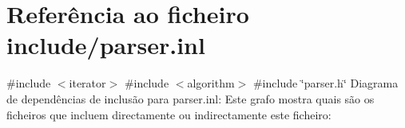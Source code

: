 \hypertarget{parser_8inl}{}\section{Referência ao ficheiro include/parser.inl}
\label{parser_8inl}
{\ttfamily \#include $<$iterator$>$}\newline
{\ttfamily \#include $<$algorithm$>$}\newline
{\ttfamily \#include \char`\"{}parser.\+h\char`\"{}}\newline
Diagrama de dependências de inclusão para parser.\+inl\+:
Este grafo mostra quais são os ficheiros que incluem directamente ou indirectamente este ficheiro\+:
